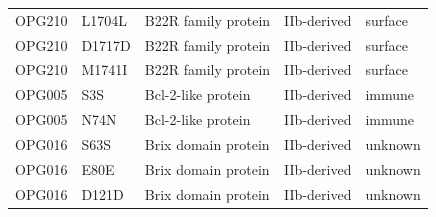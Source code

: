 \documentclass[11pt]{article}
\begin{document}
\begin{longtable}{lllll}
OPG210 & L1704L & B22R family protein & IIb-derived & surface \\
OPG210 & D1717D & B22R family protein & IIb-derived & surface \\
OPG210 & M1741I & B22R family protein & IIb-derived & surface \\
OPG005 & S3S & Bcl-2-like protein & IIb-derived & immune \\
OPG005 & N74N & Bcl-2-like protein & IIb-derived & immune \\
OPG016 & S63S & Brix domain protein & IIb-derived & unknown \\
OPG016 & E80E & Brix domain protein & IIb-derived & unknown \\
OPG016 & D121D & Brix domain protein & IIb-derived & unknown \\
\hline
\end{longtable}
\end{document}
